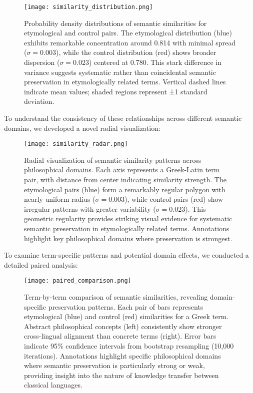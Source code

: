 \documentclass[11pt]{article} %
\begin{document}
\begin{figure}[htbp]
\centering
\texttt{[image: similarity\_distribution.png]}
\caption{Probability density distributions of semantic similarities for etymological and control pairs. The etymological distribution (blue) exhibits remarkable concentration around 0.814 with minimal spread ($\sigma = 0.003$), while the control distribution (red) shows broader dispersion ($\sigma = 0.023$) centered at 0.780. This stark difference in variance suggests systematic rather than coincidental semantic preservation in etymologically related terms. Vertical dashed lines indicate mean values; shaded regions represent ±1 standard deviation.}
\label{fig:distribution}
\end{figure}

To understand the consistency of these relationships across different semantic domains, we developed a novel radial visualization:

\begin{figure}[htbp]
\centering
\texttt{[image: similarity\_radar.png]}
\caption{Radial visualization of semantic similarity patterns across philosophical domains. Each axis represents a Greek-Latin term pair, with distance from center indicating similarity strength. The etymological pairs (blue) form a remarkably regular polygon with nearly uniform radius ($\sigma = 0.003$), while control pairs (red) show irregular patterns with greater variability ($\sigma = 0.023$). This geometric regularity provides striking visual evidence for systematic semantic preservation in etymologically related terms. Annotations highlight key philosophical domains where preservation is strongest.}
\label{fig:radar}
\end{figure}

To examine term-specific patterns and potential domain effects, we conducted a detailed paired analysis:

\begin{figure}[htbp]
\centering
\texttt{[image: paired\_comparison.png]}
\caption{Term-by-term comparison of semantic similarities, revealing domain-specific preservation patterns. Each pair of bars represents etymological (blue) and control (red) similarities for a Greek term. Abstract philosophical concepts (left) consistently show stronger cross-lingual alignment than concrete terms (right). Error bars indicate 95\% confidence intervals from bootstrap resampling (10,000 iterations). Annotations highlight specific philosophical domains where semantic preservation is particularly strong or weak, providing insight into the nature of knowledge transfer between classical languages.}
\label{fig:paired}
\end{figure}
\end{document}
